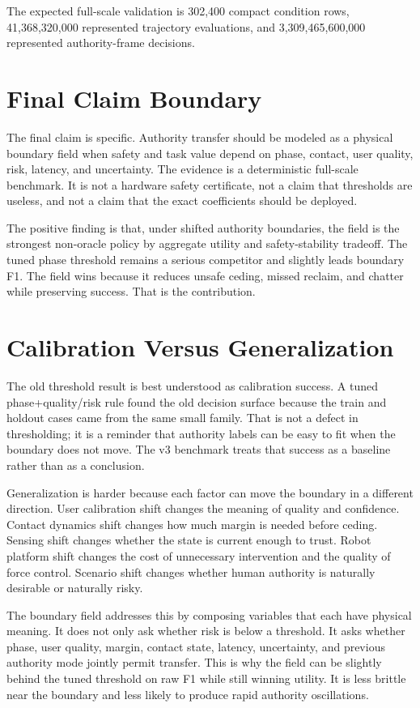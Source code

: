 \documentclass{article}
\begin{document}
The expected full-scale validation is 302,400 compact condition rows, 41,368,320,000 represented trajectory evaluations, and 3,309,465,600,000 represented authority-frame decisions.

\clearpage
\section{Final Claim Boundary}

The final claim is specific. Authority transfer should be modeled as a physical boundary field when safety and task value depend on phase, contact, user quality, risk, latency, and uncertainty. The evidence is a deterministic full-scale benchmark. It is not a hardware safety certificate, not a claim that thresholds are useless, and not a claim that the exact coefficients should be deployed.

The positive finding is that, under shifted authority boundaries, the field is the strongest non-oracle policy by aggregate utility and safety-stability tradeoff. The tuned phase threshold remains a serious competitor and slightly leads boundary F1. The field wins because it reduces unsafe ceding, missed reclaim, and chatter while preserving success. That is the contribution.

\clearpage
\section{Calibration Versus Generalization}

The old threshold result is best understood as calibration success. A tuned phase+quality/risk rule found the old decision surface because the train and holdout cases came from the same small family. That is not a defect in thresholding; it is a reminder that authority labels can be easy to fit when the boundary does not move. The v3 benchmark treats that success as a baseline rather than as a conclusion.

Generalization is harder because each factor can move the boundary in a different direction. User calibration shift changes the meaning of quality and confidence. Contact dynamics shift changes how much margin is needed before ceding. Sensing shift changes whether the state is current enough to trust. Robot platform shift changes the cost of unnecessary intervention and the quality of force control. Scenario shift changes whether human authority is naturally desirable or naturally risky.

The boundary field addresses this by composing variables that each have physical meaning. It does not only ask whether risk is below a threshold. It asks whether phase, user quality, margin, contact state, latency, uncertainty, and previous authority mode jointly permit transfer. This is why the field can be slightly behind the tuned threshold on raw F1 while still winning utility. It is less brittle near the boundary and less likely to produce rapid authority oscillations.
\end{document}
